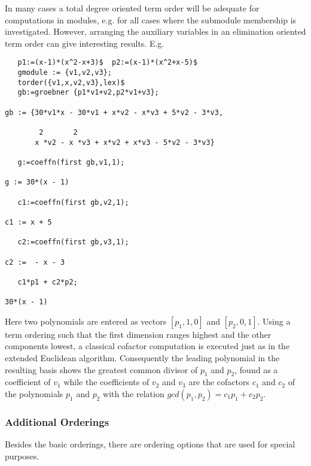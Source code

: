 In many cases a total degree oriented term order will be adequate
for computations in modules, e.g. for all cases where the
submodule membership is investigated. However, arranging
the auxiliary variables in an elimination oriented term order
can give interesting results. E.g.
\begin{verbatim}
   p1:=(x-1)*(x^2-x+3)$  p2:=(x-1)*(x^2+x-5)$
   gmodule := {v1,v2,v3};
   torder({v1,x,v2,v3},lex)$
   gb:=groebner {p1*v1+v2,p2*v1+v3};

gb := {30*v1*x - 30*v1 + x*v2 - x*v3 + 5*v2 - 3*v3,

        2       2
       x *v2 - x *v3 + x*v2 + x*v3 - 5*v2 - 3*v3}

   g:=coeffn(first gb,v1,1);

g := 30*(x - 1)

   c1:=coeffn(first gb,v2,1);

c1 := x + 5

   c2:=coeffn(first gb,v3,1);

c2 :=  - x - 3

   c1*p1 + c2*p2;

30*(x - 1)
\end{verbatim}
Here two polynomials
are entered as vectors $[p_1,1,0]$ and $[p_2,0,1]$. Using a term
ordering such that the first dimension ranges highest and the
other components lowest, a classical cofactor computation is
executed just as in the extended Euclidean algorithm.
Consequently the leading polynomial in the resulting
basis shows the greatest common divisor of $p_1$ and $p_2$,
found as a coefficient of $v_1$ while the coefficients
of $v_2$ and $v_3$ are the cofactors $c_1$ and $c_2$ of the polynomials
$p_1$ and $p_2$ with the relation $gcd(p_1,p_2) = c_1p_1 + c_2p_2$.

\subsubsection{Additional Orderings}
Besides the basic orderings, there are ordering options that are used for
special purposes.

